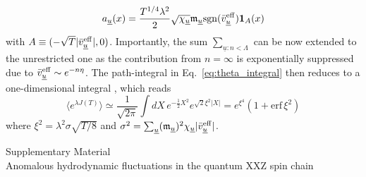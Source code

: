 \documentclass[
twocolumn,
amsfonts,
showpacs,
superscriptaddress,
amsmath,
amssymb,
aps,
longbibliography,
prl,
noeprint
]{revtex4-2}
\newcommand{\ch}[1]{{\color{black}  #1}}
\newcommand{\bveff}{\bar{v}^\eff}
\newcommand{\1}{{\bf 1}}
\newcommand{\eff}{{\rm eff}}
\begin{document}
\begin{equation}
    a_{\underline{u}}(x)=\frac{T^{1/4}\lambda^2}{2}\sqrt{\chi_{\underline{u}}}\mathfrak{m}_{\underline{u}}\mathrm{sgn}(\bveff_{\underline{u}})\mathbf{1}_{A}(x)
\end{equation}
with $A \equiv (-\sqrt{T}|\bveff_{\underline{u}}|,0)$. \ch{Importantly, the sum $\sum_{\underline{u}:n<\Lambda}$ can be now extended to the unrestricted one as the contribution from $n=\infty$ is exponentially suppressed due to $\bveff_{\underline{u}}\sim e^{-n\eta}$.}
The path-integral in Eq.~\eqref{eq:theta_integral} then reduces to a one-dimensional integral \cite{Yoshimura2025}, which reads
\begin{equation}
    \langle e^{\lambda J(T)}\rangle\simeq \frac{1}{\sqrt{2\pi}}\int dX\,e^{-\frac{1}{2}X^2}e^{\sqrt{2}\xi^2|X|}=e^{\xi^4}(1+\mathrm{erf}\,\xi^2)
\end{equation}
where $\xi^2=\lambda^2\sigma\sqrt{T/8}$ and $\sigma^2=\sum_{\underline{u}}(\mathfrak{m}_{\underline{u}})^2\chi_{\underline{u}}|\bveff_{\underline{u}}|$.







\clearpage
\onecolumngrid
\newpage
\setcounter{equation}{0}
\setcounter{figure}{0}

\setcounter{page}{1}
\setcounter{section}{0}
\renewcommand\thesection{\arabic{section}}
\renewcommand\thesubsection{\arabic{subsection}}
\renewcommand{\thetable}{S\arabic{table}}
\renewcommand{\theequation}{S\arabic{equation}}
\renewcommand{\thefigure}{S\arabic{figure}}
\setcounter{secnumdepth}{2}

\begin{center}
{\Large Supplementary Material\\
\vspace{5pt}
Anomalous hydrodynamic fluctuations in the quantum XXZ spin chain
}
\end{center}
\bigskip
\bigskip
\end{document}
